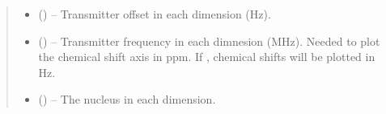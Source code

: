 \documentclass[letterpaper,10pt,english]{sphinxmanual}
\begin{document}
\begin{fulllineitems}
\begin{quote}
\begin{description}
\begin{itemize}
\item {} 
\sphinxAtStartPar
{} (\sphinxstyleliteralemphasis{\sphinxupquote{{[}}}\sphinxstyleliteralemphasis{\sphinxupquote{{]} or }}\sphinxstyleliteralemphasis{\sphinxupquote{{[}}}\sphinxstyleliteralemphasis{\sphinxupquote{, }}\sphinxstyleliteralemphasis{\sphinxupquote{{]}}}) – Transmitter offset in each dimension (Hz).

\item {} 
\sphinxAtStartPar
{} (\sphinxstyleliteralemphasis{\sphinxupquote{{[}}}\sphinxstyleliteralemphasis{\sphinxupquote{, }}\sphinxstyleliteralemphasis{\sphinxupquote{{[}}}\sphinxstyleliteralemphasis{\sphinxupquote{, }}\sphinxstyleliteralemphasis{\sphinxupquote{{]} or }}\sphinxstyleliteralemphasis{\sphinxupquote{, }}) – Transmitter frequency in each dimnesion (MHz). Needed to plot the
chemical shift axis in ppm. If , chemical shifts will be plotted
in Hz.

\item {} 
\sphinxAtStartPar
{} (\sphinxstyleliteralemphasis{\sphinxupquote{{[}}}\sphinxstyleliteralemphasis{\sphinxupquote{{]}}}\sphinxstyleliteralemphasis{\sphinxupquote{, }}\sphinxstyleliteralemphasis{\sphinxupquote{{[}}}\sphinxstyleliteralemphasis{\sphinxupquote{, }}\sphinxstyleliteralemphasis{\sphinxupquote{{]} or }}\sphinxstyleliteralemphasis{\sphinxupquote{, }}) – The nucleus in each dimension.


\end{itemize}
\end{description}
\end{quote}
\end{fulllineitems}
\end{document}
